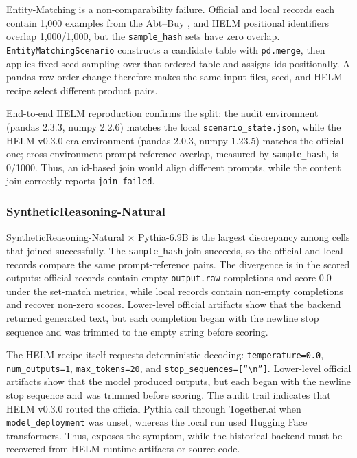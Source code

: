 Entity-Matching is a non-comparability failure. Official and local records each
contain 1,000 examples from the Abt--Buy \citep{kopcke2010evaluation}, and HELM positional identifiers overlap
1,000/1,000, but the \texttt{sample\_hash} sets have zero overlap.
\texttt{EntityMatchingScenario} constructs a candidate table with
\texttt{pd.merge}, then applies fixed-seed sampling over that ordered table and
assigns ids positionally. A pandas row-order change therefore makes the same input files,
seed, and HELM recipe select different product pairs.

End-to-end HELM reproduction confirms the split: the audit environment
(pandas 2.3.3, numpy 2.2.6) matches the local
\texttt{scenario\_state.json}, while the HELM v0.3.0-era environment
(pandas 2.0.3, numpy 1.23.5) matches the official one; cross-environment prompt-reference overlap, measured by \texttt{sample\_hash},
is 0/1000. Thus, an id-based join would align different prompts,
while the \eee{} content join correctly reports \texttt{join\_failed}.

\subsubsection{SyntheticReasoning-Natural}
\label{sec:app-helm-sr-natural}

SyntheticReasoning-Natural $\times$ Pythia-6.9B is the largest discrepancy
among cells that joined successfully. The \texttt{sample\_hash} join succeeds,
so the official and local records compare the same prompt-reference pairs. The
divergence is in the scored outputs: official records contain empty
\texttt{output.raw} completions and score 0.0 under the set-match metrics,
while local records contain non-empty completions and recover non-zero scores.
Lower-level official artifacts show that the backend returned generated text,
but each completion began with the newline stop sequence and was trimmed to the
empty string before scoring.

The HELM recipe itself requests deterministic decoding:
\texttt{temperature=0.0}, \texttt{num\_outputs=1}, \texttt{max\_tokens=20}, and
\texttt{stop\_sequences=[``\textbackslash n'']}. Lower-level official artifacts
show that the model produced outputs, but each began with the newline stop
sequence and was trimmed before scoring. The audit trail indicates that HELM
v0.3.0 routed the official Pythia call through Together.ai when
\texttt{model\_deployment} was unset, whereas the local run used Hugging Face
transformers. Thus, \eee{} exposes the symptom, while the historical backend
must be recovered from HELM runtime artifacts or source code.

